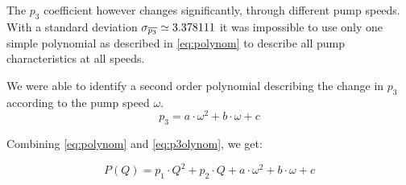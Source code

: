 The $p_3$ coefficient however changes significantly, through different pump speeds.
With a standard deviation $\sigma_{\overline{p_3}} \simeq 3.378111$ it was impossible to use only one simple polynomial as described in 
\ref{eq:polynom} to describe all pump characteristics at all speeds.

We were able to identify a second order polynomial describing the change in $p_3$ according to the pump speed $\omega$.
\begin{equation}
	 p_3 = a \cdot \omega^2 + b \cdot \omega + c
	 \label{eq:p3olynom}
\end{equation}

Combining \ref{eq:polynom} and \ref{eq:p3olynom}, we get:

\begin{equation}
	P(Q) = p_1 \cdot Q^2 + p_2 \cdot Q + a \cdot \omega^2 + b \cdot \omega + c 
\end{equation}
